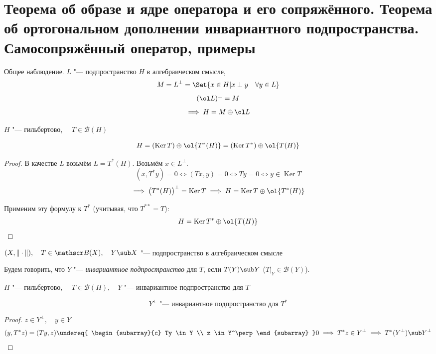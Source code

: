 \section{Теорема об образе и ядре оператора и его сопряжённого.
Теорема об ортогональном дополнении инвариантного подпространства.
Самосопряжённый оператор, примеры}

\begin{undefthm}{Общее наблюдение.}
	$ L $ "--- подпространство $ H $ в алгебраическом смысле,
	$$ M = L^\perp = \Set{x \in H | x \perp y \quad \forall y \in L} $$
	$$ (\ol L)^\perp = M $$
	$$ \implies H = M \oplus \ol L $$
\end{undefthm}

\begin{theorem}
	$ H $ "--- гильбертово, $ \quad T \in \mathscr B(H) $

	$$ H = (\operatorname{Ker} T) \oplus \ol{T^*(H)} = (\operatorname{Ker}T^*) \oplus \ol{T(H)} $$
\end{theorem}

\begin{proof}
	В качестве $ L $ возьмём $ L = T^*(H) $.
	Возьмём $ x \in L^\perp $.
	$$ (x, T^*y) = 0 \iff (Tx, y) = 0 \iff Ty = 0 \iff y \in \operatorname{Ker} T $$
	$$ \implies \bigl( T^*(H) \bigr)^\perp = \operatorname{Ker}T \implies H =
	\operatorname{Ker} T \oplus \ol{T^*(H)} $$

	Применим эту формулу к $ T^* $ (учитывая, что $ T^{**} = T $):
	$$ H = \operatorname{Ker} T^* \oplus \ol{T(H)} $$
\end{proof}

\begin{definition}
	$ (X, \|\cdot\|), \quad T \in \mathscr B(X), \quad Y \sub X $ "--- подпространство
	в алгебраическом смысле

	Будем говорить, что $ Y $ "--- \emph{инвариантное подпространство} для $ T $, если
	$ T(Y) \sub Y $ (\ie $ T\bigr|_Y \in \mathscr B(Y) $).
\end{definition}

\begin{theorem}
	$ H $ "--- гильбертово, $ \quad T \in \mathscr B(H), \quad Y $ "--- инвариантное
	подпространство для $ T $

	$$ Y^\perp \text{ "--- инвариантное подпространство для } T^* $$
\end{theorem}

\begin{proof}
	$ z \in Y^\perp, \quad y \in Y $
	$$ (y, T^*z) = (Ty, z) \undereq{
		\begin{subarray}{c}
			Ty \in Y \\
			z \in Y^\perp
		\end{subarray}
	} 0 \implies T^*z \in Y^\perp \implies T^*(Y^\perp) \sub Y^\perp $$
\end{proof}

